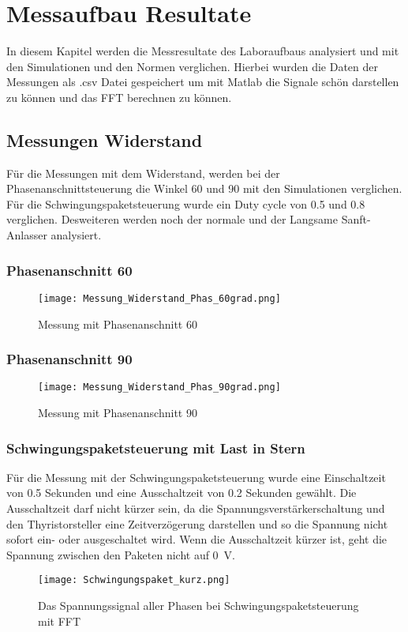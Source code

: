 \section{Messaufbau Resultate}
In diesem Kapitel werden die Messresultate des Laboraufbaus analysiert und mit den Simulationen und den Normen verglichen. Hierbei wurden die Daten der Messungen als .csv Datei gespeichert um mit Matlab die Signale schön darstellen zu können und das FFT berechnen zu können. 

\subsection{Messungen Widerstand}
Für die Messungen mit dem Widerstand, werden bei der Phasenanschnittsteuerung die Winkel 60\textdegree \hspace{0.02cm} und 90\textdegree \hspace{0.02cm} mit den Simulationen verglichen. Für die Schwingungspaketsteuerung wurde ein Duty cycle von 0.5 und 0.8 verglichen. Desweiteren werden noch der normale und der Langsame Sanft-Anlasser analysiert.
\subsubsection{Phasenanschnitt 60\textdegree}

\begin{figure}[ht!]
	\centering
	\texttt{[image: Messung\_Widerstand\_Phas\_60grad.png]}	
	\caption{Messung mit Phasenanschnitt 60\textdegree}\label{fig:Mess_Phas_60}
\end{figure}

\subsubsection{Phasenanschnitt 90\textdegree}
\begin{figure}[ht!]
	\centering
	\texttt{[image: Messung\_Widerstand\_Phas\_90grad.png]}	
	\caption{Messung mit Phasenanschnitt 90\textdegree}\label{fig:Mess_Phas_90}
\end{figure}


\subsubsection{Schwingungspaketsteuerung mit Last in Stern}
Für die Messung mit der Schwingungspaketsteuerung wurde eine Einschaltzeit von 0.5 Sekunden und eine Ausschaltzeit von 0.2 Sekunden gewählt. Die Ausschaltzeit darf nicht kürzer sein, da die Spannungsverstärkerschaltung und den Thyristorsteller eine Zeitverzögerung darstellen und so die Spannung nicht sofort ein- oder ausgeschaltet wird. Wenn die Ausschaltzeit kürzer ist, geht die Spannung zwischen den Paketen nicht auf \SI{0}{V}. 
\begin{figure}[ht!]
	\centering
	\texttt{[image: Schwingungspaket\_kurz.png]}	
	\caption{Das Spannungssignal aller Phasen bei Schwingungspaketsteuerung mit FFT}\label{fig:Mess_Schwing_kurz}
\end{figure}

